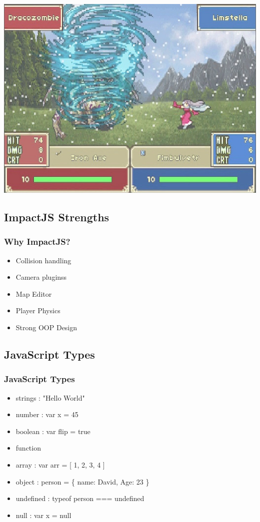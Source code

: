 \documentclass[red]{beamer}
\begin{document}
\begin{frame}
\includegraphics[height=0.9\textheight]{fireemblem.jpg}
\end{frame}

\subsection{ImpactJS Strengths}

\begin{frame}
  \frametitle{Why ImpactJS?}   %

  \begin{itemize}
  \item Collision handling
  \item Camera pluginss
  \item Map Editor
  \item Player Physics
  \item Strong OOP Design
  \end{itemize}
\end{frame}

\subsection{JavaScript Types}

\begin{frame}
	\frametitle{JavaScript Types}
	 \begin{itemize}
  		\item<1-> strings : "Hello World"
 		\item<2-> number : var x = 45
 		\item<3-> boolean : var flip = true
		\item<4-> function
		\item<4-> array : var arr = [ 1, 2, 3, 4 ]
		\item<5->object : person = \{ name: David, Age: 23 \}
		\item<6->undefined : typeof person === undefined
		\item<7->null : var x = null
 	 \end{itemize}
\end{frame}
\end{document}
